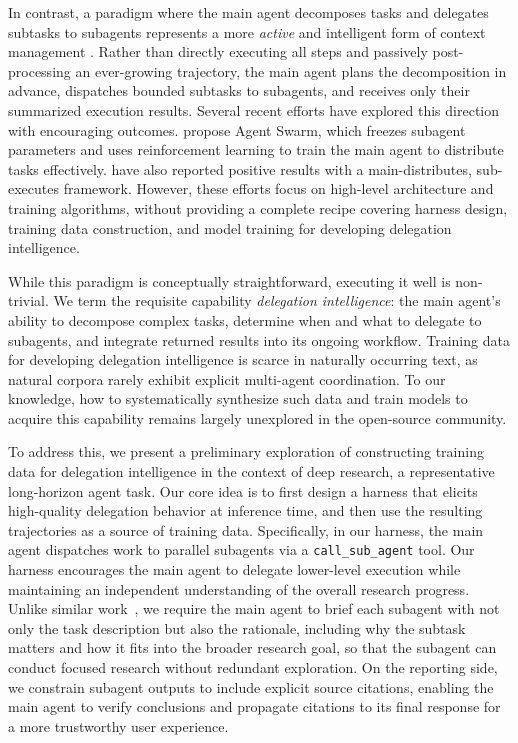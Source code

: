 \documentclass{llmxive}
\begin{document}
In contrast, a paradigm where the main agent decomposes tasks and delegates subtasks to subagents represents a more \emph{active} and intelligent form of context management \citep{anthropic2025multiagent}. Rather than directly executing all steps and passively post-processing an ever-growing trajectory, the main agent plans the decomposition in advance, dispatches bounded subtasks to subagents, and receives only their summarized execution results. Several recent efforts have explored this direction with encouraging outcomes. \citet{team2026kimi} propose Agent Swarm, which freezes subagent parameters and uses reinforcement learning to train the main agent to distribute tasks effectively. \citet{huang2026step} have also reported positive results with a main-distributes, sub-executes framework. However, these efforts focus on high-level architecture and training algorithms, without providing a complete recipe covering harness design, training data construction, and model training for developing delegation intelligence.

While this paradigm is conceptually straightforward, executing it well is non-trivial. We term the requisite capability \emph{delegation intelligence}: the main agent's ability to decompose complex tasks, determine when and what to delegate to subagents, and integrate returned results into its ongoing workflow. Training data for developing delegation intelligence is scarce in naturally occurring text, as natural corpora rarely exhibit explicit multi-agent coordination. To our knowledge, how to systematically synthesize such data and train models to acquire this capability remains largely unexplored in the open-source community.

To address this, we present a preliminary exploration of constructing training data for delegation intelligence in the context of deep research, a representative long-horizon agent task. Our core idea is to first design a harness that elicits high-quality delegation behavior at inference time, and then use the resulting trajectories as a source of training data. Specifically, in our harness, the main agent dispatches work to parallel subagents via a \texttt{call\_sub\_agent} tool. Our harness encourages the main agent to delegate lower-level execution while maintaining an independent understanding of the overall research progress. Unlike similar work~\citep{huang2026wideseek, xu2026wideseek}, we require the main agent to brief each subagent with not only the task description but also the rationale, including why the subtask matters and how it fits into the broader research goal, so that the subagent can conduct focused research without redundant exploration. On the reporting side, we constrain subagent outputs to include explicit source citations, enabling the main agent to verify conclusions and propagate citations to its final response for a more trustworthy user experience.
\end{document}
